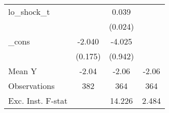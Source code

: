 {\begin{tabular}{l*{3}{c}}
\addlinespace
lo\_shock\_t  &                     &       0.039         &                     \\
            &                     &     (0.024)         &                     \\
\addlinespace
\_cons      &      -2.040\sym{***}&      -4.025\sym{***}&                     \\
            &     (0.175)         &     (0.942)         &                     \\
\midrule
Mean Y      &       -2.04         &       -2.06         &       -2.06         \\
Observations&         382         &         364         &         364         \\
Exc. Inst. F-stat&                     &      14.226         &       2.484         \\
\bottomrule
\end{tabular}
}
